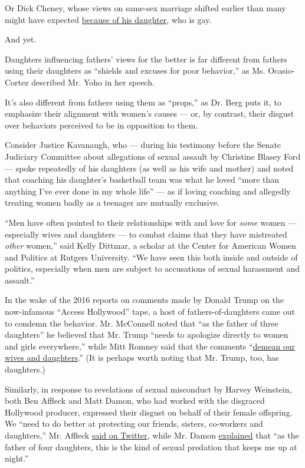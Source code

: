 Or Dick Cheney, whose views on same-sex marriage shifted earlier than
many might have expected
\href{https://www.washingtonpost.com/arts-entertainment/2018/12/27/vice-looks-back-how-dick-cheneys-daughter-mary-shaped-his-views-same-sex-marriage/}{because
of his daughter}, who is gay.

And yet.

Daughters influencing fathers' views for the better is far different
from fathers using their daughters as ``shields and excuses for poor
behavior,'' as Ms. Ocasio-Cortez described Mr. Yoho in her speech.

It's also different from fathers using them as ``props,'' as Dr. Berg
puts it, to emphasize their alignment with women's causes --- or, by
contrast, their disgust over behaviors perceived to be in opposition to
them.

Consider Justice Kavanaugh, who --- during his testimony before the
Senate Judiciary Committee about allegations of sexual assault by
Christine Blasey Ford --- spoke repeatedly of his daughters (as well as
his wife and mother) and noted that coaching his daughter's basketball
team was what he loved ``more than anything I've ever done in my whole
life'' --- as if loving coaching and allegedly treating women badly as a
teenager are mutually exclusive.

``Men have often pointed to their relationships with and love for
\emph{some} women --- especially wives and daughters --- to combat
claims that they have mistreated \emph{other} women,'' said Kelly
Dittmar, a scholar at the Center for American Women and Politics at
Rutgers University. ``We have seen this both inside and outside of
politics, especially when men are subject to accusations of sexual
harassment and assault.''

In the wake of the 2016 reports on comments made by Donald Trump on the
now-infamous ``Access Hollywood'' tape, a host of fathers-of-daughters
came out to condemn the behavior. Mr. McConnell noted that ``as the
father of three daughters'' he believed that Mr. Trump ``needs to
apologize directly to women and girls everywhere,'' while Mitt Romney
said that the comments
``\href{https://twitter.com/MittRomney/status/784546373525966849}{demean
our wives and daughters}.'' (It is perhaps worth noting that Mr. Trump,
too, has daughters.)

Similarly, in response to revelations of sexual misconduct by Harvey
Weinstein, both Ben Affleck and Matt Damon, who had worked with the
disgraced Hollywood producer, expressed their disgust on behalf of their
female offspring. We ``need to do better at protecting our friends,
sisters, co-workers and daughters,'' Mr. Affleck
\href{https://twitter.com/BenAffleck/status/917787533802655744}{said on
Twitter}, while Mr. Damon
\href{https://deadline.com/2017/10/matt-damon-harvey-weinstein-russell-crowe-sexual-abuse-scandal-interview-1202185574/}{explained}
that ``as the father of four daughters, this is the kind of sexual
predation that keeps me up at night.''

